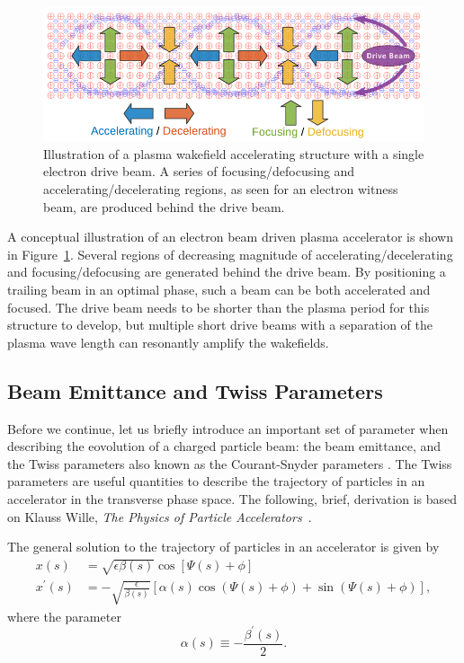 \begin{figure}[hbt]
    \centering
    \includegraphics[width=0.85\linewidth]{figures/PlasmaWakefield}
    \caption{\label{Fig:PWFA:Illust} Illustration of a plasma wakefield accelerating structure with a single electron drive beam. A series of focusing\slash defocusing and accelerating\slash decelerating regions, as seen for an electron witness beam, are produced behind the drive beam.}
\end{figure}

A conceptual illustration of an electron beam driven plasma accelerator is shown in Figure~\ref{Fig:PWFA:Illust}. Several regions of decreasing magnitude of accelerating\slash decelerating and focusing\slash defocusing are generated behind the drive beam. By positioning a trailing beam in an optimal phase, such a beam can be both accelerated and focused. The drive beam needs to be shorter than the plasma period for this structure to develop, but multiple short drive beams with a separation of the plasma wave length can resonantly amplify the wakefields.

\subsection{Beam Emittance and Twiss Parameters}
\label{Int:BPI:EnTwiss}

Before we continue, let us briefly introduce an important set of parameter when describing the eovolution of a charged particle beam: the beam emittance, and the Twiss parameters also known as the Courant-Snyder parameters \cite{courant:1958}.
The Twiss parameters are useful quantities to describe the trajectory of particles in an accelerator in the transverse phase space.
The following, brief, derivation is based on Klauss Wille, \textit{The Physics of Particle Accelerators}~\cite{wille:2001}.

The general solution to the trajectory of particles in an accelerator is given by
\begin{align}
    x(s)          &=  \sqrt{\epsilon\beta(s)} \cos\left[\Psi(s) + \phi\right] \label{EQ:PTrajX} \\
    x^{\prime}(s) &= -\sqrt{\frac{\epsilon}{\beta(s)}}
                     \left[\alpha(s)\cos\left(\Psi(s) + \phi\right) + \sin\left(\Psi(s) + \phi\right)\right], \label{EQ:PTrajXP}
\end{align}
where the parameter
\begin{equation}
    \alpha(s) \equiv -\frac{\beta^{\prime}(s)}{2}. \label{EQ:TwissAlpha}
\end{equation}

